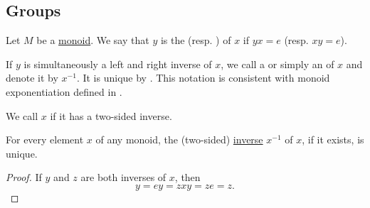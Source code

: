 \subsection{Groups}\label{subsec:groups}

\begin{definition}\label{def:monoid_inverse}
  Let \( M \) be a \hyperref[def:monoid]{monoid}. We say that \( y \) is the  (resp. ) of \( x \) if \( yx = e \) (resp. \( xy = e \)).

  If \( y \) is simultaneously a left and right inverse of \( x \), we call a  or simply an  of \( x \) and denote it by \( x^{-1} \). It is unique by . This notation is consistent with monoid exponentiation defined in .

  We call \( x \)  if it has a two-sided inverse.
\end{definition}

\begin{proposition}\label{thm:monoid_inverse_unique}
  For every element \( x \) of any monoid, the (two-sided) \hyperref[def:monoid_inverse]{inverse} \( x^{-1} \) of \( x \), if it exists, is unique.
\end{proposition}
\begin{proof}
  If \( y \) and \( z \) are both inverses of \( x \), then
  \begin{equation*}
    y = ey = zxy = ze = z.
  \end{equation*}
\end{proof}

